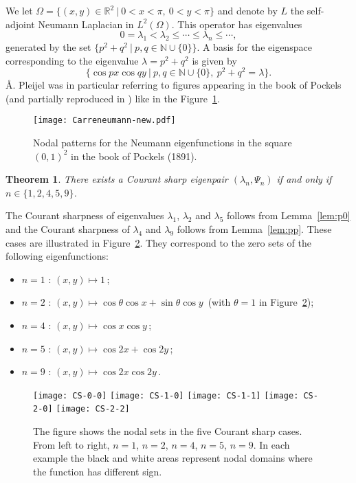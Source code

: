 \documentclass[a4paper,reqno,11pt]{amsart}
\newtheorem{thm}{Theorem}[section]
\theoremstyle{remark}
\theoremstyle{definition}
\numberwithin{equation}{section}
\begin{document}
We let $\Omega=\{(x,y)\in\mathbb{R}^2~|~0<x<\pi,\ 0<y<\pi\}$ and
denote by $L$ the self-adjoint Neumann Laplacian in $L^2(\Omega)$.
This operator has eigenvalues
\[
0=\lambda_1<\lambda_2\leq\cdots \leq \lambda_n\leq \cdots,
\]
generated by the set $\{p^2+q^2~|~p,q\in\mathbb{N}\cup\{0\}\}$. 
A basis for the eigenspace corresponding to the eigenvalue
$\lambda=p^2+q^2$ is given by
\[
\{\cos px\cos qy~|~p,q\in\mathbb{N}\cup\{0\},\ p^2+q^2=\lambda\}.
\]
\AA. Pleijel was in particular referring to  figures appearing in the book of 
Pockels~\cite{Po} 
(and partially reproduced in \cite{CH}) like in the Figure~\ref{Pockel}.
\begin{figure}[htbp]
\centering
\texttt{[image: Carreneumann-new.pdf]} \label{Pockel}
\caption{Nodal patterns for the Neumann eigenfunctions in the square 
$(0,1)^2$ in the book of Pockels (1891).}
\end{figure}

\begin{thm}
\label{thm:main} There exists a Courant sharp eigenpair 
 $(\lambda_n,\Psi_n)$  if and only if $n\in\{1,2,4,5,9\}$.
\end{thm}

 The Courant sharpness of eigenvalues $\lambda_1$, $\lambda_2$ and $\lambda_5$ follows from Lemma~\ref{lem:p0} and the Courant sharpness of 
$\lambda_4$ and $\lambda_9$ follows from Lemma~\ref{lem:pp}. These cases are
illustrated in Figure~\ref{fig:CS}. They 
correspond to the zero sets of the following eigenfunctions:
\begin{itemize}
\item $n=1$ : $(x,y)\mapsto 1$\,;
\item $n=2$ : $(x,y)\mapsto \cos \theta \cos x + \sin \theta \cos y\,$ (with $\theta=1$ in Figure~\ref{fig:CS}); 

\item $n=4$ : $(x,y) \mapsto \cos x \cos y\,$;
\item $n=5$ : $(x,y) \mapsto \cos 2x + \cos 2y\,$;
\item $n=9$ : $(x,y) \mapsto \cos 2x \cos 2y\,$.
\end{itemize}

\begin{figure}[htbp]
\centering
\texttt{[image: CS-0-0]}
\hskip 0.5cm
\texttt{[image: CS-1-0]}
\hskip 0.5cm
\texttt{[image: CS-1-1]}
\hskip 0.5cm
\texttt{[image: CS-2-0]}
\hskip 0.5cm
\texttt{[image: CS-2-2]}
\caption{The figure shows the nodal sets  in the five Courant sharp cases. From 
left to right, $n=1$, $n=2$, $n=4$, $n=5$, $n=9$. In each example the black
and white areas represent nodal domains where the function has different sign.}
\label{fig:CS}
\end{figure}
\end{document}
